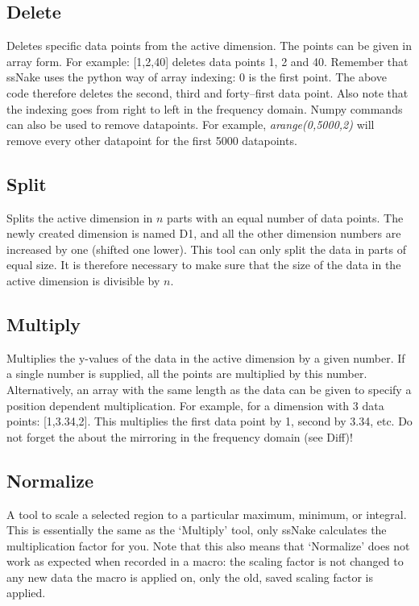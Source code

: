 \documentclass[11pt,a4paper]{article}
\begin{document}
\subsection{Delete}
Deletes specific data points from the active dimension.
The points can be given in array form.
For example: [1,2,40] deletes data points 1, 2 and 40.
Remember that ssNake uses the python way of array indexing: 0 is the first point.
The above code therefore deletes the second, third and forty--first data point.
Also note that the indexing goes from right to left in the frequency domain.
Numpy commands can also be used to remove datapoints.
For example, \textit{arange(0,5000,2)} will remove every other datapoint for the first 5000 datapoints.

\subsection{Split}
Splits the active dimension in $n$ parts with an equal number of data points.
The newly created dimension is named D1, and all the other dimension numbers are increased by one (shifted one lower).
This tool can only split the data in parts of equal size.
It is therefore necessary to make sure that the size of the data in the active dimension is divisible by $n$.

\subsection{Multiply}
Multiplies the y-values of the data in the active dimension by a given number.
If a single number is supplied, all the points are multiplied by this number.
Alternatively, an array with the same length as the data can be given to specify a position dependent multiplication.
For example, for a dimension with 3 data points: [1,3.34,2].
This multiplies the first data point by 1, second by 3.34, etc.
Do not forget the about the mirroring in the frequency domain (see Diff)!

\subsection{Normalize}
A tool to scale a selected region to a particular maximum, minimum, or integral.
This is essentially the same as the `Multiply' tool, only ssNake calculates the multiplication factor for you. Note that this also means that `Normalize' does not work as expected when recorded in a macro: the scaling factor is not changed to any new data the macro is applied on, only the old, saved scaling factor is applied.
\end{document}
